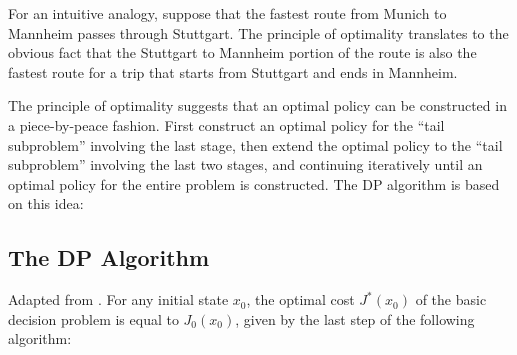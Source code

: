 For an intuitive analogy, suppose that the fastest route from Munich to Mannheim
passes through Stuttgart. The principle of optimality translates to the obvious
fact that the Stuttgart to Mannheim portion of the route is also the fastest
route for a trip that starts from Stuttgart and ends in Mannheim.

The principle of optimality suggests that an optimal policy can be constructed
in a piece-by-peace fashion. First construct an optimal policy for the ``tail
subproblem'' involving the last stage, then extend the optimal policy to the
``tail subproblem'' involving the last two stages, and continuing iteratively
until an optimal policy for the entire problem is constructed. The DP algorithm
is based on this idea:

\subsection*{The DP Algorithm} \label{sec:DPalgorithm}

Adapted from \cite{bertsekas1995dynamic}. For any initial state $x_0$, the
optimal cost $J^*(x_0)$ of the basic decision problem is equal to $J_0(x_0)$,
given by the last step of the following algorithm: 


\begin{center}
\end{center}
